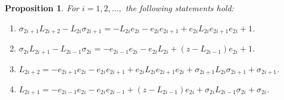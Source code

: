 \documentclass[11pt,a4paper,reqno,svgnames]{amsart}
\theoremstyle{plain}
\newtheorem{proposition}[theorem]{Proposition}
\theoremstyle{definition}
\numberwithin{equation}{section}
\begin{document}
\begin{proposition}\label{t-0}
For $i=1,2,\ldots,$ the following statements hold:
\begin{enumerate}[label=(\arabic{*}), ref=\arabic{*},leftmargin=0pt,itemindent=1.5em]
\item $\sigma_{2i+1}L_{2i+2}-L_{2i}\sigma_{2i+1}=-L_{2i}e_{2i}-e_{2i}e_{2i+1}+e_{2i}L_{2i}e_{2i+1}e_{2i}+1$. \label{t-0-1}
\item $\sigma_{2i}L_{2i+1}-L_{2i-1}\sigma_{2i}=-e_{2i-1}e_{2i}-e_{2i}L_{2i}+(z-L_{2i-1})e_{2i}+1$.\label{t-0-2}
\item\label{j-n-1} $L_{2i+2}=-e_{2i+1}e_{2i}-e_{2i}e_{2i+1}+e_{2i}L_{2i}e_{2i+1}e_{2i}+\sigma_{2i+1}L_{2i}\sigma_{2i+1}+\sigma_{2i+1}$. 
\item\label{j-n-2} $L_{2i+1}=-e_{2i-1}e_{2i}-e_{2i}e_{2i-1}
+(z-L_{2i-1})e_{2i} +\sigma_{2i}L_{2i-1}\sigma_{2i}+\sigma_{2i}$.
\end{enumerate}
\end{proposition}
\end{document}
